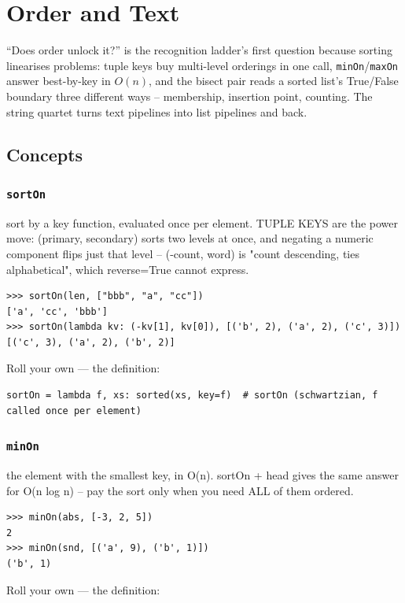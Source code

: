 \documentclass[10pt,letterpaper]{book}
\begin{document}
\clearpage
\chapter{Order and Text}

``Does order unlock it?'' is the recognition ladder's first question because
sorting linearises problems: tuple keys buy multi-level orderings in one
call, \texttt{minOn}/\texttt{maxOn} answer best-by-key in $O(n)$, and the
bisect pair reads a sorted list's True/False boundary three different ways
-- membership, insertion point, counting. The string quartet turns text
pipelines into list pipelines and back.
\section{Concepts}
\subsection{\texttt{sortOn}}\label{def:sortOn}
sort by a key function, evaluated once per element. TUPLE KEYS are the power move: (primary, secondary) sorts two levels at once, and negating a numeric component flips just that level -- (-count, word) is "count descending, ties alphabetical", which reverse=True cannot express.
\begin{lstlisting}[style=ex]
>>> sortOn(len, ["bbb", "a", "cc"])
['a', 'cc', 'bbb']
>>> sortOn(lambda kv: (-kv[1], kv[0]), [('b', 2), ('a', 2), ('c', 3)])
[('c', 3), ('a', 2), ('b', 2)]
\end{lstlisting}

Roll your own --- the definition:

\begin{lstlisting}[style=ex]
sortOn = lambda f, xs: sorted(xs, key=f)  # sortOn (schwartzian, f called once per element)
\end{lstlisting}
\subsection{\texttt{minOn}}\label{def:minOn}
the element with the smallest key, in O(n). sortOn + head gives the same answer for O(n log n) -- pay the sort only when you need ALL of them ordered.
\begin{lstlisting}[style=ex]
>>> minOn(abs, [-3, 2, 5])
2
>>> minOn(snd, [('a', 9), ('b', 1)])
('b', 1)
\end{lstlisting}

Roll your own --- the definition:
\end{document}
